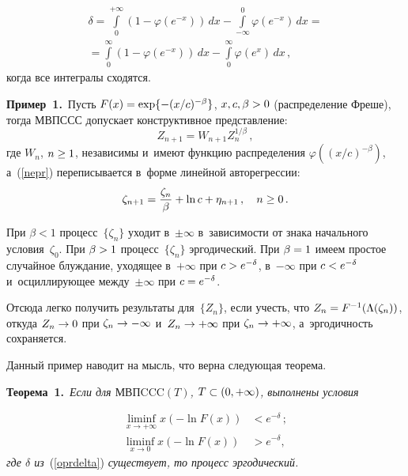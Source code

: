 \begin{multicols}{2}
\noindent
\begin{multline}
\label{formdelta}
\delta=\int\limits_0^{+\infty}\left(1-\varphi\left(e^{-x}\right)\right)\,dx-
\int\limits_{-\infty}^0\varphi\left(e^{-x}\right)\,dx={}\\[-1pt]
{}=
\int\limits_0^\infty\left(1-\varphi\left(e^{-x}\right)\right)\,dx-
\int\limits_0^\infty\varphi\left(e^x\right)\,dx\,,
\end{multline}
когда все интегралы сходятся.

\vspace*{2pt}

\noindent
\textbf{Пример~1.}\
Пусть $F(x)\hm=\exp\{-(x/c)^{-\beta}\}$, $x,c,\beta\hm>0$ (распределение
Фреше), тогда МВПССС допускает конструктивное пред\-став\-ле\-ние:
\begin{equation}
\label{zw}
Z_{n+1}=W_{n+1}Z_n^{1/\beta}\,,
\end{equation}
где $W_n$, $n\hm\ge 1$, независимы и~име\-ют функцию распределения 
$\varphi((x/c)^{-\beta})$,
а~(\ref{nepr}) переписывается в~форме линейной авторегрессии:
\begin{equation}
\label{zb}
\zeta_{n+1}=\displaystyle\frac{\displaystyle \zeta_n\mathstrut}{\displaystyle \beta\mathstrut}+\ln c+\eta_{n+1}\,,\quad n\ge 0\,.
\end{equation}

При $\beta<1$ процесс~$\{\zeta_n\}$
уходит в~$\pm\infty$ в~за\-ви\-си\-мости от знака начального усло\-вия~$\zeta_0$.
При $\beta\hm>1$ процесс~$\{\zeta_n\}$ эргодический. При $\beta\hm=1$ имеем
прос\-тое случайное блуж\-да\-ние, уходящее в~$+\infty$ при $c\hm>e^{-\delta}$,
в~$-\infty$ при $c\hm<e^{-\delta}$ и~ос\-цил\-ли\-ру\-ющее меж\-ду~$\pm\infty$ при
$c\hm=e^{-\delta}$.

Отсюда легко получить результаты для~$\{Z_n\}$, если
учесть, что $Z_n\hm=F^{-1}(\Lambda(\zeta_n))$, откуда $Z_n\hm\to 0$ при
$\zeta_n\hm\to -\infty$ и~$Z_n\hm\to +\infty$ при $\zeta_n\hm\to +\infty$,
а~эргодичность со\-хра\-ня\-ется.

Данный пример наводит на мысль, что верна следующая теорема.

\smallskip

\noindent
\textbf{Теорема~1.}\ \textit{Если для $\mathrm{МВПCCC}(T)$, $T\hm\subset (0,+\infty)$, 
выполнены условия}

\noindent
\begin{align}
\label{usl1}
\liminf\limits_{x\to+\infty} x(-\ln F(x))&<e^{-\delta}\,;
\\
\label{usl2}
\liminf_{x\to 0} x(-\ln F(x))&>e^{-\delta},
\end{align}
\textit{где $\delta$ из}~(\ref{oprdelta}) \textit{существует, то процесс эргодический.}


\end{multicols}
